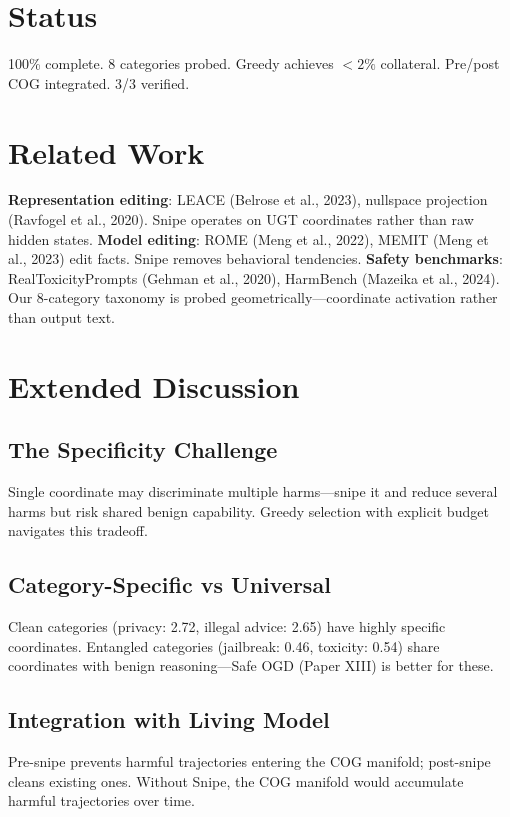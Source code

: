 \documentclass[11pt,a4paper]{article}
\begin{document}
\section{Status}
100\% complete. 8 categories probed. Greedy achieves $<2\%$ collateral. Pre/post COG integrated. 3/3 verified.

\newpage

\section{Related Work}
\textbf{Representation editing}: LEACE (Belrose et al., 2023), nullspace projection (Ravfogel et al., 2020). Snipe operates on UGT coordinates rather than raw hidden states. \textbf{Model editing}: ROME (Meng et al., 2022), MEMIT (Meng et al., 2023) edit facts. Snipe removes behavioral tendencies. \textbf{Safety benchmarks}: RealToxicityPrompts (Gehman et al., 2020), HarmBench (Mazeika et al., 2024). Our 8-category taxonomy is probed geometrically---coordinate activation rather than output text.

\section{Extended Discussion}
\subsection{The Specificity Challenge}
Single coordinate may discriminate multiple harms---snipe it and reduce several harms but risk shared benign capability. Greedy selection with explicit budget navigates this tradeoff.

\subsection{Category-Specific vs Universal}
Clean categories (privacy: 2.72, illegal advice: 2.65) have highly specific coordinates. Entangled categories (jailbreak: 0.46, toxicity: 0.54) share coordinates with benign reasoning---Safe OGD (Paper XIII) is better for these.

\subsection{Integration with Living Model}
Pre-snipe prevents harmful trajectories entering the COG manifold; post-snipe cleans existing ones. Without Snipe, the COG manifold would accumulate harmful trajectories over time.
\end{document}
